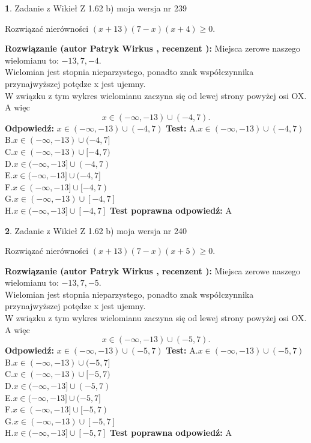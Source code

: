 \documentclass[12pt, a4paper]{article}
\theoremstyle{definition} %
\newtheorem{zad}{}
\newcommand{\zadStart}[1]{\begin{zad}#1\newline}
\newcommand{\zadStop}{\end{zad}}
\newcommand{\rozwStart}[2]{\noindent \textbf{Rozwiązanie (autor #1 , recenzent #2): }\newline}
\newcommand{\rozwStop}{\newline}
\newcommand{\odpStart}{\noindent \textbf{Odpowiedź:}\newline}
\newcommand{\odpStop}{\newline}
\newcommand{\testStart}{\noindent \textbf{Test:}\newline}
\newcommand{\testStop}{\newline}
\newcommand{\kluczStart}{\noindent \textbf{Test poprawna odpowiedź:}\newline}
\newcommand{\kluczStop}{\newline}
\begin{document}
\zadStart{Zadanie z Wikieł Z 1.62 b) moja wersja nr 239}

Rozwiązać nierówności $(x+13)(7-x)(x+4)\ge0$.
\zadStop
\rozwStart{Patryk Wirkus}{}
Miejsca zerowe naszego wielomianu to: $-13, 7, -4$.\\
Wielomian jest stopnia nieparzystego, ponadto znak współczynnika przy\linebreak najwyższej potędze x jest ujemny.\\ W związku z tym wykres wielomianu zaczyna się od lewej strony powyżej osi OX. A więc $$x \in (-\infty,-13) \cup (-4,7).$$
\rozwStop
\odpStart
$x \in (-\infty,-13) \cup (-4,7)$
\odpStop
\testStart
A.$x \in (-\infty,-13) \cup (-4,7)$\\
B.$x \in (-\infty,-13) \cup (-4,7]$\\
C.$x \in (-\infty,-13) \cup [-4,7)$\\
D.$x \in (-\infty,-13] \cup (-4,7)$\\
E.$x \in (-\infty,-13] \cup (-4,7]$\\
F.$x \in (-\infty,-13] \cup [-4,7)$\\
G.$x \in (-\infty,-13) \cup [-4,7]$\\
H.$x \in (-\infty,-13] \cup [-4,7]$
\testStop
\kluczStart
A
\kluczStop



\zadStart{Zadanie z Wikieł Z 1.62 b) moja wersja nr 240}

Rozwiązać nierówności $(x+13)(7-x)(x+5)\ge0$.
\zadStop
\rozwStart{Patryk Wirkus}{}
Miejsca zerowe naszego wielomianu to: $-13, 7, -5$.\\
Wielomian jest stopnia nieparzystego, ponadto znak współczynnika przy\linebreak najwyższej potędze x jest ujemny.\\ W związku z tym wykres wielomianu zaczyna się od lewej strony powyżej osi OX. A więc $$x \in (-\infty,-13) \cup (-5,7).$$
\rozwStop
\odpStart
$x \in (-\infty,-13) \cup (-5,7)$
\odpStop
\testStart
A.$x \in (-\infty,-13) \cup (-5,7)$\\
B.$x \in (-\infty,-13) \cup (-5,7]$\\
C.$x \in (-\infty,-13) \cup [-5,7)$\\
D.$x \in (-\infty,-13] \cup (-5,7)$\\
E.$x \in (-\infty,-13] \cup (-5,7]$\\
F.$x \in (-\infty,-13] \cup [-5,7)$\\
G.$x \in (-\infty,-13) \cup [-5,7]$\\
H.$x \in (-\infty,-13] \cup [-5,7]$
\testStop
\kluczStart
A
\kluczStop
\end{document}
